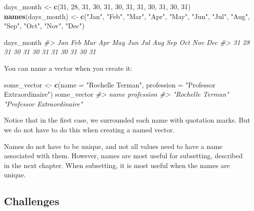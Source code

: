 \documentclass[
]{book}
\newenvironment{Shaded}{\begin{snugshade}}{\end{snugshade}}
\newcommand{\CommentTok}[1]{\textcolor[rgb]{0.56,0.35,0.01}{\textit{#1}}}
\newcommand{\DataTypeTok}[1]{\textcolor[rgb]{0.13,0.29,0.53}{#1}}
\newcommand{\DecValTok}[1]{\textcolor[rgb]{0.00,0.00,0.81}{#1}}
\newcommand{\KeywordTok}[1]{\textcolor[rgb]{0.13,0.29,0.53}{\textbf{#1}}}
\newcommand{\NormalTok}[1]{#1}
\newcommand{\StringTok}[1]{\textcolor[rgb]{0.31,0.60,0.02}{#1}}
\begin{document}
\begin{Shaded}
\begin{Highlighting}[]
\NormalTok{days_month <-}\StringTok{ }\KeywordTok{c}\NormalTok{(}\DecValTok{31}\NormalTok{, }\DecValTok{28}\NormalTok{, }\DecValTok{31}\NormalTok{, }\DecValTok{30}\NormalTok{, }\DecValTok{31}\NormalTok{, }\DecValTok{30}\NormalTok{, }\DecValTok{31}\NormalTok{, }\DecValTok{31}\NormalTok{, }\DecValTok{30}\NormalTok{, }\DecValTok{31}\NormalTok{, }\DecValTok{30}\NormalTok{, }\DecValTok{31}\NormalTok{)}
\KeywordTok{names}\NormalTok{(days_month) <-}\StringTok{ }\KeywordTok{c}\NormalTok{(}\StringTok{"Jan"}\NormalTok{, }\StringTok{"Feb"}\NormalTok{, }\StringTok{"Mar"}\NormalTok{, }\StringTok{"Apr"}\NormalTok{, }\StringTok{"May"}\NormalTok{, }\StringTok{"Jun"}\NormalTok{, }\StringTok{"Jul"}\NormalTok{, }\StringTok{"Aug"}\NormalTok{, }\StringTok{"Sep"}\NormalTok{, }\StringTok{"Oct"}\NormalTok{, }\StringTok{"Nov"}\NormalTok{, }\StringTok{"Dec"}\NormalTok{)}

\NormalTok{days_month}
\CommentTok{#> Jan Feb Mar Apr May Jun Jul Aug Sep Oct Nov Dec }
\CommentTok{#>  31  28  31  30  31  30  31  31  30  31  30  31}
\end{Highlighting}
\end{Shaded}

You can name a vector when you create it:

\begin{Shaded}
\begin{Highlighting}[]
\NormalTok{some_vector <-}\StringTok{ }\KeywordTok{c}\NormalTok{(}\DataTypeTok{name =} \StringTok{"Rochelle Terman"}\NormalTok{, }\DataTypeTok{profession =} \StringTok{"Professor Extraordinaire"}\NormalTok{)}
\NormalTok{some_vector}
\CommentTok{#>                       name                 profession }
\CommentTok{#>          "Rochelle Terman" "Professor Extraordinaire"}
\end{Highlighting}
\end{Shaded}

Notice that in the first case, we surrounded each name with quotation marks. But we do not have to do this when creating a named vector.

Names do not have to be unique, and not all values need to have a name associated with them. However, names are most useful for subsetting, described in the next chapter. When subsetting, it is most useful when the names are unique.

\hypertarget{challenges-11}{%
\subsection{Challenges}\label{challenges-11}}
\end{document}
